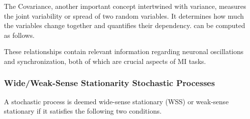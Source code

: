 The Covariance, another important concept intertwined with variance, measures the joint variability or spread of two random variables. It determines how much the variables change together and quantifies their dependency.  can be computed as follows.


 These relationships contain relevant information regarding neuronal oscillations and synchronization, both of which are crucial aspects of MI tasks. 

\subsubsection{Wide/Weak-Sense Stationarity Stochastic Processes}

A stochastic process is deemed wide-sense stationary (WSS) or weak-sense stationary if it satisfies the following two conditions.

